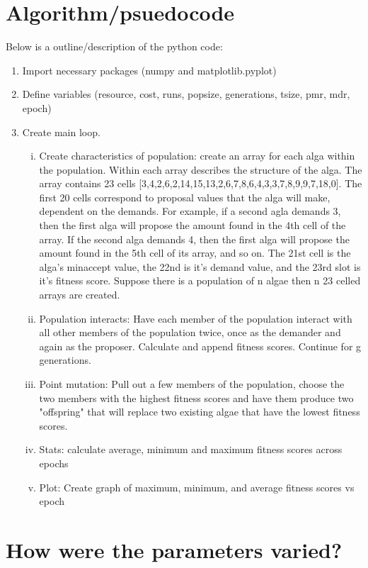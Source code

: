 \documentclass[]{article}
\begin{document}
\section{Algorithm/psuedocode}\label{algorithmpsuedocode}

Below is a outline/description of the python code:

\begin{enumerate}[\{1\}]
\item Import necessary packages (numpy and matplotlib.pyplot)
\item Define variables (resource, cost, runs, popsize, generations, tsize, pmr, mdr, epoch)
\item Create main loop. 
    \begin{enumerate}[i)]
        \item Create characteristics of population: create an array for each alga within the population. Within each array describes the structure of the alga. The array contains 23 cells [3,4,2,6,2,14,15,13,2,6,7,8,6,4,3,3,7,8,9,9,7,18,0].
The first 20 cells correspond to proposal values that the alga will make, dependent on the demands. For example, if a second agla demands 3, then the first alga will propose the amount found in the 4th cell of the array. If the second alga demands 4, then the first alga will propose the amount found in the 5th cell of its array, and so on. The 21st cell is the alga's minaccept value, the 22nd is it's demand value, and the 23rd slot is it's fitness score. Suppose there is a population of n algae then n 23 celled arrays are created.   
        \item Population interacts: Have each member of the population interact with all other members of the population twice, once as the demander and again as the proposer. Calculate and append fitness scores. Continue for g generations. 
        \item Point mutation: Pull out a few members of the population, choose the two members with the highest fitness scores and have them produce two "offspring" that will replace two existing algae that have the lowest fitness scores.
        \item Stats: calculate average, minimum and maximum fitness scores across epochs
        \item Plot: Create graph of maximum, minimum, and average fitness scores vs epoch
            \end{enumerate}
\end{enumerate}

\section{How were the parameters
varied?}\label{how-were-the-parameters-varied}
\end{document}
